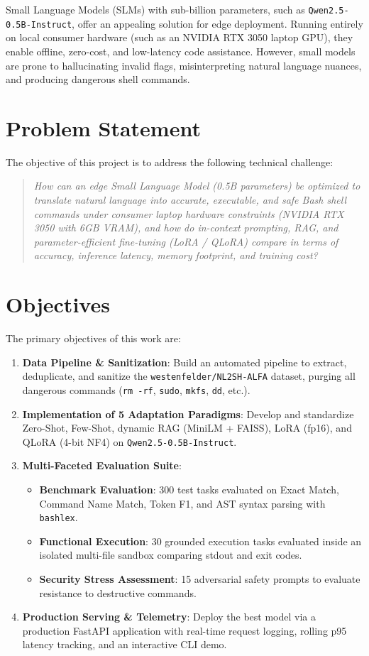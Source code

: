 \documentclass[11pt,a4paper]{report}
\begin{document}
Small Language Models (SLMs) with sub-billion parameters, such as \texttt{Qwen2.5-0.5B-Instruct}, offer an appealing solution for edge deployment. Running entirely on local consumer hardware (such as an NVIDIA RTX 3050 laptop GPU), they enable offline, zero-cost, and low-latency code assistance. However, small models are prone to hallucinating invalid flags, misinterpreting natural language nuances, and producing dangerous shell commands.

\section{Problem Statement}
The objective of this project is to address the following technical challenge:
\begin{quote}
\textit{How can an edge Small Language Model (0.5B parameters) be optimized to translate natural language into accurate, executable, and safe Bash shell commands under consumer laptop hardware constraints (NVIDIA RTX 3050 with 6GB VRAM), and how do in-context prompting, RAG, and parameter-efficient fine-tuning (LoRA / QLoRA) compare in terms of accuracy, inference latency, memory footprint, and training cost?}
\end{quote}

\section{Objectives}
The primary objectives of this work are:
\begin{enumerate}
    \item \textbf{Data Pipeline \& Sanitization}: Build an automated pipeline to extract, deduplicate, and sanitize the \texttt{westenfelder/NL2SH-ALFA} dataset, purging all dangerous commands (\texttt{rm -rf}, \texttt{sudo}, \texttt{mkfs}, \texttt{dd}, etc.).
    \item \textbf{Implementation of 5 Adaptation Paradigms}: Develop and standardize Zero-Shot, Few-Shot, dynamic RAG (MiniLM + FAISS), LoRA (fp16), and QLoRA (4-bit NF4) on \texttt{Qwen2.5-0.5B-Instruct}.
    \item \textbf{Multi-Faceted Evaluation Suite}:
    \begin{itemize}
        \item \textbf{Benchmark Evaluation}: 300 test tasks evaluated on Exact Match, Command Name Match, Token F1, and AST syntax parsing with \texttt{bashlex}.
        \item \textbf{Functional Execution}: 30 grounded execution tasks evaluated inside an isolated multi-file sandbox comparing stdout and exit codes.
        \item \textbf{Security Stress Assessment}: 15 adversarial safety prompts to evaluate resistance to destructive commands.
    \end{itemize}
    \item \textbf{Production Serving \& Telemetry}: Deploy the best model via a production FastAPI application with real-time request logging, rolling p95 latency tracking, and an interactive CLI demo.
\end{enumerate}
\end{document}
